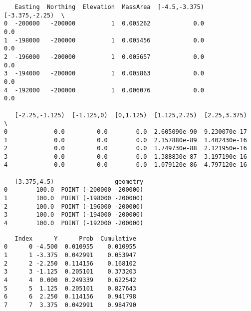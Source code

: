 \documentclass[11pt]{article}
\begin{document}
    
    
    \begin{verbatim}
   Easting  Northing  Elevation  MassArea  [-4.5,-3.375)  [-3.375,-2.25)  \
0  -200000   -200000          1  0.005262            0.0             0.0   
1  -198000   -200000          1  0.005456            0.0             0.0   
2  -196000   -200000          1  0.005657            0.0             0.0   
3  -194000   -200000          1  0.005863            0.0             0.0   
4  -192000   -200000          1  0.006076            0.0             0.0   

   [-2.25,-1.125)  [-1.125,0)  [0,1.125)  [1.125,2.25)  [2.25,3.375)  \
0             0.0         0.0        0.0  2.605090e-90  9.230070e-17   
1             0.0         0.0        0.0  2.157880e-89  1.402430e-16   
2             0.0         0.0        0.0  1.749730e-88  2.121950e-16   
3             0.0         0.0        0.0  1.388830e-87  3.197190e-16   
4             0.0         0.0        0.0  1.079120e-86  4.797120e-16   

   [3.375,4.5)                 geometry  
0        100.0  POINT (-200000 -200000)  
1        100.0  POINT (-198000 -200000)  
2        100.0  POINT (-196000 -200000)  
3        100.0  POINT (-194000 -200000)  
4        100.0  POINT (-192000 -200000)  
    \end{verbatim}

    
    
    \begin{verbatim}
   Index      Y      Prob  Cumulative
0      0 -4.500  0.010955    0.010955
1      1 -3.375  0.042991    0.053947
2      2 -2.250  0.114156    0.168102
3      3 -1.125  0.205101    0.373203
4      4  0.000  0.249339    0.622542
5      5  1.125  0.205101    0.827643
6      6  2.250  0.114156    0.941798
7      7  3.375  0.042991    0.984790
    \end{verbatim}
\end{document}
